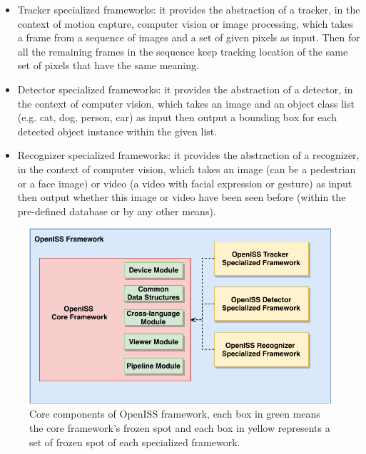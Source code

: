 \begin{itemize}
    \item Tracker specialized frameworks: it provides the abstraction of a tracker,
    in the context of motion capture, computer vision or image processing,
    which takes a frame from a sequence of images and a set of given pixels as
    input. Then for all the remaining frames in the sequence keep tracking
    location of the same set of pixels that have the same meaning.

    \item Detector specialized frameworks: it provides the abstraction of a
    detector, in the context of computer vision, which takes an image and an
    object class list (e.g. cat, dog, person, car) as input then output a
    bounding box for each detected object instance within the given list.

    \item Recognizer specialized frameworks: it provides the abstraction of a
    recognizer, in the context of computer vision, which takes an image (can be
    a pedestrian or a face image) or video (a video with facial expression or
    gesture) as input then output whether this image or video have been seen
    before (within the pre-defined database or by any other means).
\end{itemize}

\begin{figure}
    \includegraphics[width=\linewidth]{figures/framework_core_module.pdf}
    \caption[Core components of OpenISS framework]
    {Core components of OpenISS framework, each box in green means the core
    framework's frozen spot and each box in yellow represents a set of frozen
    spot of each specialized framework.}
    \label{fig:fw-core-module}
\end{figure}

